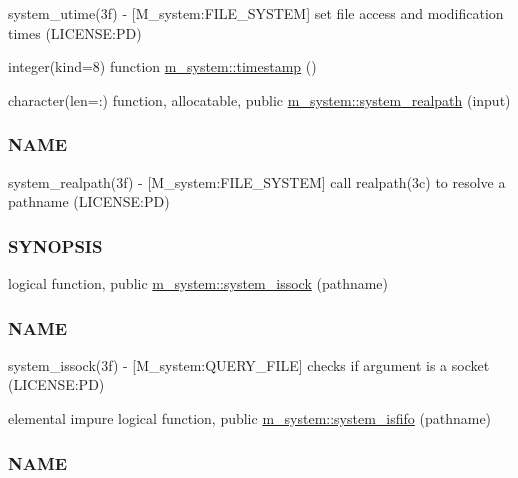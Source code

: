 \begin{DoxyCompactItemize}
\begin{DoxyCompactList}
system\+\_\+utime(3f) -\/ \mbox{[}M\+\_\+system\+:F\+I\+L\+E\+\_\+\+S\+Y\+S\+T\+EM\mbox{]} set file access and modification times (L\+I\+C\+E\+N\+SE\+:PD) \end{DoxyCompactList}\item 
integer(kind=8) function \mbox{\hyperlink{namespacem__system_a635baf5850927faa97461afaca512235}{m\+\_\+system\+::timestamp}} ()
\item 
character(len=\+:) function, allocatable, public \mbox{\hyperlink{namespacem__system_a70bbfa0a0be084b9717cbc04408041fc}{m\+\_\+system\+::system\+\_\+realpath}} (input)
\begin{DoxyCompactList}\small\item\em \subsubsection*{N\+A\+ME}

system\+\_\+realpath(3f) -\/ \mbox{[}M\+\_\+system\+:F\+I\+L\+E\+\_\+\+S\+Y\+S\+T\+EM\mbox{]} call realpath(3c) to resolve a pathname (L\+I\+C\+E\+N\+SE\+:PD) \subsubsection*{S\+Y\+N\+O\+P\+S\+IS}\end{DoxyCompactList}\item 
logical function, public \mbox{\hyperlink{namespacem__system_af6eb5074fe74552bc7a5e7d00f459087}{m\+\_\+system\+::system\+\_\+issock}} (pathname)
\begin{DoxyCompactList}\small\item\em \subsubsection*{N\+A\+ME}

system\+\_\+issock(3f) -\/ \mbox{[}M\+\_\+system\+:Q\+U\+E\+R\+Y\+\_\+\+F\+I\+LE\mbox{]} checks if argument is a socket (L\+I\+C\+E\+N\+SE\+:PD) \end{DoxyCompactList}\item 
elemental impure logical function, public \mbox{\hyperlink{namespacem__system_aa2bdb5f75405d87934c10756b539d082}{m\+\_\+system\+::system\+\_\+isfifo}} (pathname)
\begin{DoxyCompactList}\small\item\em \subsubsection*{N\+A\+ME}


\end{DoxyCompactList}
\end{DoxyCompactItemize}
